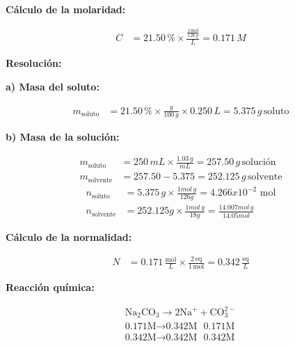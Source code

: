 \documentclass{article}
\begin{document}
\textbf{Cálculo de la molaridad:}

\begin{align*}
    C &= 21.50 \, \% \times \frac{\frac{1 \, \text{mol}}{126 \, g}}{L} = 0.171 \, M
\end{align*}


\noindent\textbf{Resolución:} %

\textbf{a) Masa del soluto:}

\begin{align*}
    m_{\text{soluto}} &= 21.50 \, \% \times \frac{g}{100 \, g} \times 0.250 \, L = 5.375 \, g \, \text{soluto}
\end{align*}

\textbf{b) Masa de la solución:}

\begin{align*}
    m_{\text{soluto}} &= 250 \, mL \times \frac{1.03 \, g}{mL} = 257.50 \, g \, \text{solución} \\[10pt]
    m_{\text{solvente}} &= 257.50 - 5.375 = 252.125 \, g \, \text{solvente}
\end{align*}
\begin{align*}
    n_{\text{soluto}} &= 5.375 \, g \times \frac{1mol \, g}{126g} = 4.266x10^{-2} \,  \, \text{mol} \\[10pt]
    n_{\text{solvente}} &= 252.125g \times \frac{1mol \, g}{18g} = \frac{14.007mol \, g}{14.05mol}
\end{align*}


\textbf{Cálculo de la normalidad:}

\begin{align*}
    N &= 0.171 \, \frac{\text{mol}}{L} \times \frac{2 \, \text{eq}}{1 \, \text{mol}} = 0.342 \, \frac{\text{eq}}{L}
\end{align*}

\textbf{Reacción química:}

\begin{align*}
    \text{Na}_2\text{CO}_3 \rightarrow 2\text{Na}^+ + \text{CO}_3^{2-} \\
    \text{0.171M} \rightarrow \text{0.342M } \text{ 0.171M} \\
    \text{0.342M} \rightarrow \text{0.342M }\text{ 0.342M}
\end{align*}

\end{document}
